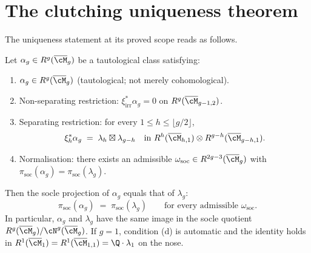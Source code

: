 \section{The clutching uniqueness theorem}
\label{sec:clutching-uniqueness-theorem}

The uniqueness statement at its proved scope reads as follows.

\begin{theorem}
\label{thm:clutching-uniqueness-socle-projection}
Let $\alpha_g \in R^g(\overline{\cM}_g)$ be a tautological class
satisfying:
\begin{enumerate}[label=\textup{(\alph*)}]
\item $\alpha_g \in R^g(\overline{\cM}_g)$ (tautological;
not merely cohomological).
\item Non-separating restriction: $\xi_{\mathrm{irr}}^* \alpha_g = 0$ on
$R^g(\overline{\cM}_{g-1,2})$.
\item Separating restriction: for every
$1 \leq h \leq \lfloor g/2\rfloor$,
\[
\xi_h^* \alpha_g \;=\; \lambda_h \boxtimes \lambda_{g-h}
\quad \text{in } R^h(\overline{\cM}_{h,1})
\otimes R^{g-h}(\overline{\cM}_{g-h,1}).
\]
\item Normalisation: there exists an admissible
$\omega_{\mathrm{soc}} \in R^{2g-3}(\overline{\cM}_g)$ with
$\pi_{\mathrm{soc}}(\alpha_g) = \pi_{\mathrm{soc}}(\lambda_g)$.
\end{enumerate}
Then the socle projection of $\alpha_g$ equals that of $\lambda_g$:
\[
\pi_{\mathrm{soc}}(\alpha_g) \;=\; \pi_{\mathrm{soc}}(\lambda_g)
\qquad \text{for every admissible } \omega_{\mathrm{soc}}.
\]
In particular, $\alpha_g$ and $\lambda_g$ have the same image in the
socle quotient $R^g(\overline{\cM}_g)/\cN^g(\overline{\cM}_g)$.
If $g = 1$, condition (d) is automatic and the identity holds in
$R^1(\overline{\cM}_1) = R^1(\overline{\cM}_{1,1})
= \Q\cdot\lambda_1$ on the nose.
\end{theorem}

